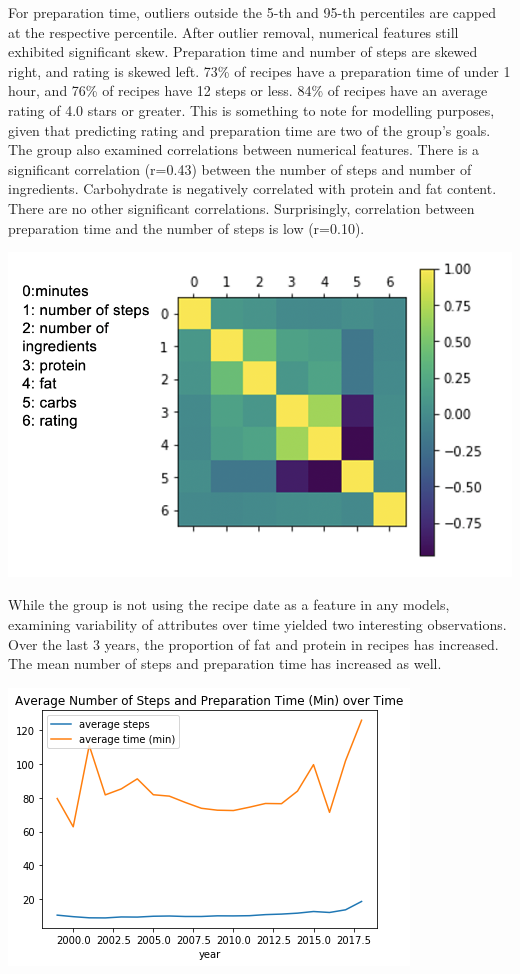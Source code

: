 \documentclass[sigconf]{acmart}
\begin{document}
For preparation time, outliers outside the 5-th and 95-th percentiles are capped at the respective percentile. After outlier removal, numerical features still exhibited significant skew. Preparation time and number of steps are skewed right, and rating is skewed left. 73\% of recipes have a preparation time of under 1 hour, and 76\% of recipes have 12 steps or less. 84\% of recipes have an average rating of 4.0 stars or greater. This is something to note for modelling purposes, given that predicting rating  and preparation time are two of the group's goals. The group also examined correlations between numerical features. There is a significant correlation (r=0.43) between the number of steps and number of ingredients. Carbohydrate is negatively correlated with protein and fat content. There are no other significant correlations. Surprisingly, correlation between preparation time and the number of steps is low (r=0.10). 

\includegraphics[width=\linewidth]{corrplot.png}

While the group is not using the recipe date as a feature in any models, examining variability of attributes over time yielded two interesting observations. Over the last 3 years, the proportion of fat and protein in recipes has increased. The mean number of steps and preparation time has increased as well.

\includegraphics[width=\linewidth]{time_series.png}
\end{document}
